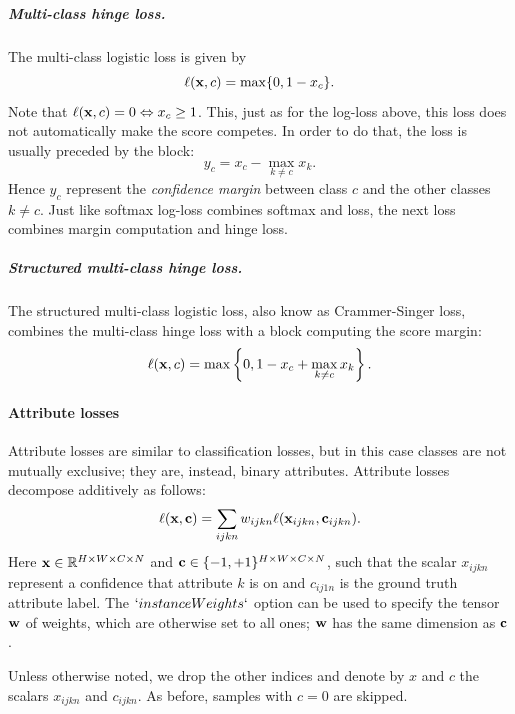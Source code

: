 \subparagraph{Multi-class hinge loss.} The multi-class logistic loss is given by
\begin{equation}\label{e:loss-multiclasshinge}
\ell(\mathbf{x}, c) = \max\{0, 1 - x_c \}.
\end{equation}
Note that $\ell(\mathbf{x},c) =0 \Leftrightarrow x_c \geq 1$. This, just as for the log-loss above, this loss does not automatically make the score competes. In order to do that, the loss is usually preceded by the block:
\[
y_c = x_c - \max_{k \not= c} x_k.
\]
Hence $y_c$ represent the \emph{confidence margin} between class $c$ and the other classes $k \not= c$. Just like softmax log-loss combines softmax and loss, the next loss combines margin computation and hinge loss.

\subparagraph{Structured multi-class hinge loss.} The structured multi-class logistic loss, also know as Crammer-Singer loss, combines the multi-class hinge loss with a block computing the score margin:
\begin{equation}\label{e:loss-structuredmulticlasshinge}
\ell(\mathbf{x}, c) = \max\left\{0, 1 - x_c + \max_{k \not= c} x_k\right\}.
\end{equation}

\paragraph{Attribute losses}\label{s:loss-attributes}

Attribute losses are similar to classification losses, but in this case classes are not mutually exclusive; they are, instead, binary attributes. Attribute losses decompose additively as follows:
\begin{equation}\label{e:addlossattribute}
\ell(\mathbf{x},\mathbf{c}) = \sum_{ijkn} w_{ijkn} \ell(\mathbf{x}_{ijkn}, \mathbf{c}_{ijkn}).
\end{equation}
Here $\mathbf{x}\in \mathbb{R}^{H \times W \times C \times N}$ and $\mathbf{c} \in \{-1,+1\}^{H \times W \times C \times N}$, such that the scalar $x_{ijkn}$ represent a confidence that attribute $k$ is on and $c_{ij1n}$ is the ground truth attribute label. The $`instanceWeights`$ option can be used to specify the tensor $\mathbf{w}$ of weights, which are otherwise set to all ones; $\mathbf{w}$ has the same dimension as $\mathbf{c}$.

Unless otherwise noted, we drop the other indices and denote by $x$ and $c$  the scalars $x_{ijkn}$ and  $c_{ijkn}$. As before, samples with $c=0$ are skipped.

